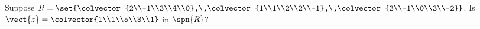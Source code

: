 Suppose $R=\set{\colvector{2\\-1\\3\\4\\0},\,\colvector{1\\1\\2\\2\\-1},\,\colvector{3\\-1\\0\\3\\-2}}$.  Is $\vect{z}=\colvector{1\\1\\5\\3\\1}$ in $\spn{R}$?
